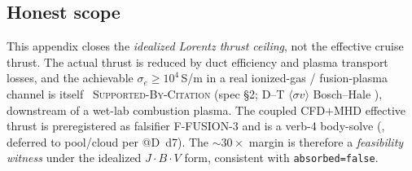 \subsection{Honest scope}
\label{app:stage2-scope}

This appendix closes the \emph{idealized Lorentz thrust ceiling}, not the
effective cruise thrust. The actual thrust is reduced by duct efficiency
and plasma transport losses, and the achievable $\sigma_e\!\ge\!10^4$\,S/m
in a real ionized-gas / fusion-plasma channel is itself \tierYellow\
\textsc{Supported-By-Citation} (spec \S2; D--T $\langle\sigma v\rangle$
Bosch--Hale \citep{boschhale1992}), downstream of a wet-lab combustion
plasma. The coupled CFD$+$MHD effective thrust is preregistered as
falsifier F-FUSION-3 and is a verb-4 body-solve (\tierOrange, deferred to
pool/cloud per @D~d7). The $\sim\!30\times$ margin is therefore a
\emph{feasibility witness} under the idealized $J\!\cdot\!B\!\cdot\!V$
form, consistent with \texttt{absorbed=false}.
